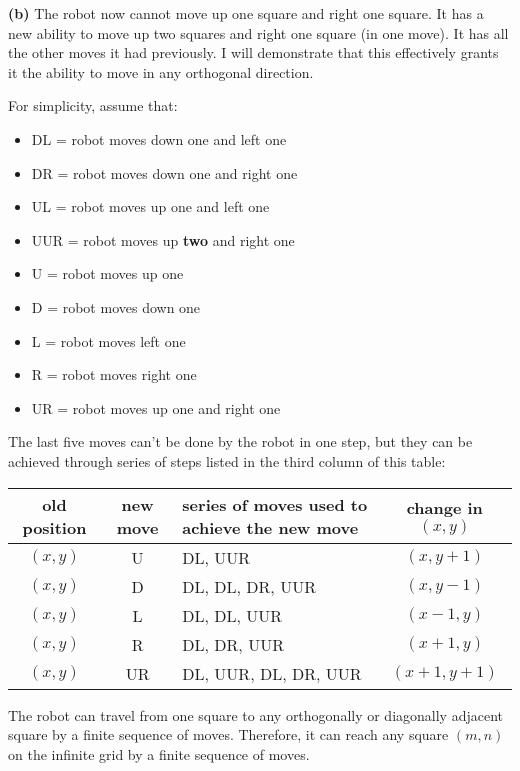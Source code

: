 \documentclass[fleqn]{article}
\begin{document}
\textbf{(b)} The robot now cannot move up one square and right one square. It has a new ability to move up two squares and right one square (in one move). It has all the other moves it had previously. I will demonstrate that this effectively grants it the ability to move in any orthogonal direction.\par
For simplicity, assume that:
\begin{itemize}
	\item DL = robot moves down one and left one
	\item DR = robot moves down one and right one
	\item UL = robot moves up one and left one
	\item UUR = robot moves up \textbf{two} and right one
	\item U = robot moves up one
	\item D = robot moves down one
	\item L = robot moves left one
	\item R = robot moves right one
	\item UR = robot moves up one and right one
\end{itemize}
The last five moves can't be done by the robot in one step, but they can be achieved through series of steps listed in the third column of this table:\vspace{0.35cm}\par
\begin{tabular}{c|c|p{4cm}|c}
	old position & new move & series of moves used to achieve the new move & change in $(x,y)$
	\tabularnewline\hline
	$(x,y)$ & U & DL, UUR & $(x,y+1)$\\
	$(x,y)$ & D & DL, DL, DR, UUR & $(x,y-1)$\\
	$(x,y)$ & L & DL, DL, UUR & $(x-1,y)$\\
	$(x,y)$ & R & DL, DR, UUR & $(x+1,y)$\\
	$(x,y)$ & UR & DL, UUR, DL, DR, UUR & $(x+1,y+1)$\\
\end{tabular}
\vspace{0.35cm}\par
The robot can travel from one square to any orthogonally or diagonally adjacent square by a finite sequence of moves. Therefore, it can reach any square $(m,n)$ on the infinite grid by a finite sequence of moves.
\end{document}
